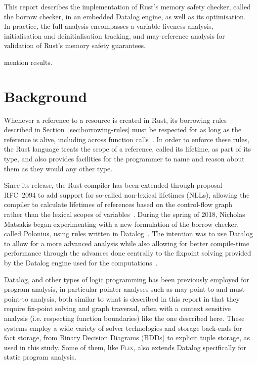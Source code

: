 \documentclass[11pt,a4paper,twoside,openany]{report}
\newcommand{\fixme}[1] {{\color{red}#1}}
\begin{document}
This report describes the implementation of Rust's memory safety checker, called
the borrow checker, in an embedded Datalog engine, as well as its optimisation.
In practice, the full analysis encompasses a variable liveness analysis,
initialisation and deinitialisation tracking, and may-reference analysis for
validation of Rust's memory safety guarantees.

\fixme{mention results.}

\chapter{Background}
Whenever a reference to a resource is created in Rust, its borrowing rules
described in Section~\ref{sec:borrowing-rules} must be respected for as long as
the reference is alive, including across function
calls~\cite{nichols_rust_nodate}. In order to enforce these rules, the Rust
language treats the scope of a reference, called its lifetime, as part of its
type, and also provides facilities for the programmer to name and reason about
them as they would any other type.

Since its release, the Rust compiler has been extended through proposal RFC~2094
to add support for so-called non-lexical lifetimes (NLLs), allowing the compiler
to calculate lifetimes of references based on the control-flow graph rather than
the lexical scopes of variables~\cite{noauthor_rfc_2019}. During the spring of
2018, Nicholas Matsakis began experimenting with a new formulation of the borrow
checker, called Polonius, using rules written in
Datalog~\cite{matsakis_alias-based_2018}. The intention was to use Datalog to
allow for a more advanced analysis while also allowing for better compile-time
performance through the advances done centrally to the fixpoint solving provided
by the Datalog engine used for the computations~\cite{datafrog}.

Datalog, and other types of logic programming has been previously employed for
program analysis, in particular pointer analyses such as may-point-to and
must-point-to analysis, both similar to what is described in this report in that
they require fix-point solving and graph traversal, often with a context
sensitive analysis (i.e. respecting function boundaries) like the
one described here\cite{Dawson:1996:PPA:231379.231399,
  Berndl:2003:PAU:780822.781144, hajiyev_codequest:_2005,
  Whaley:2004:CCP:996893.996859, lam_context-sensitive_2005,
  Benton:2007:ISD:1273920.1273923, Hardekopf:2007:AGF:1250734.1250767,
  Smaragdakis:2011:PYC:1926385.1926390, smaragdakis_using_2010,
  balatsouras_datalog_2017, Madsen:2016:DFD:2908080.2908096,
  Eichberg:2008:DCC:1368088.1368142}. These systems employ a wide variety of
solver technologies and storage back-ends for fact storage, from Binary
Decision Diagrams (BDDs) to explicit tuple storage, as used in this study. Some
of them, like \textsc{Flix}, also extends Datalog specifically for static
program analysis\cite{Madsen:2016:DFD:2908080.2908096}.
\end{document}
